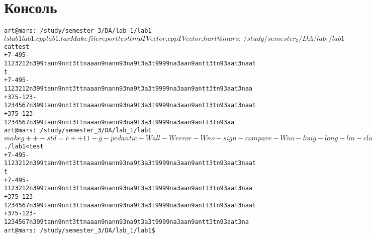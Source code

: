 \pagebreak

\section{Консоль}
\begin{alltt}art@mars:~/study/semester_3/DA/lab_1/lab1$ ls
lab1  lab1.cpp  lab1.tar  Makefile  report  test  tmp  TVector.cpp  TVector.h
art@mars:~/study/semester_3/DA/lab_1/lab1$ cat test 
+7-495-1123212	n399tann9nnt3ttnaaan9nann93na9t3a3t9999na3aan9antt3tn93aat3naatt
+7-495-1123212	n399tann9nnt3ttnaaan9nann93na9t3a3t9999na3aan9antt3tn93aat3naa
+375-123-1234567	n399tann9nnt3ttnaaan9nann93na9t3a3t9999na3aan9antt3tn93aat3naat
+375-123-1234567	n399tann9nnt3ttnaaan9nann93na9t3a3t9999na3aan9antt3tn93aa\\art@mars:~/study/semester_3/DA/lab_1/lab1$ make
g++ -std=c++11 -g -pedantic -Wall -Werror -Wno-sign-compare -Wno-long-long -lm -c lab1.cpp
g++ -std=c++11 -g -pedantic -Wall -Werror -Wno-sign-compare -Wno-long-long -lm -c TVector.cpp
g++ -std=c++11 -g -pedantic -Wall -Werror -Wno-sign-compare -Wno-long-long -lm -o lab1 lab1.o TVector.o
art@mars:~/study/semester_3/DA/lab_1/lab1$ ./lab1 < test 
+7-495-1123212	n399tann9nnt3ttnaaan9nann93na9t3a3t9999na3aan9antt3tn93aat3naatt
+7-495-1123212	n399tann9nnt3ttnaaan9nann93na9t3a3t9999na3aan9antt3tn93aat3naa
+375-123-1234567	n399tann9nnt3ttnaaan9nann93na9t3a3t9999na3aan9antt3tn93aat3naat
+375-123-1234567	n399tann9nnt3ttnaaan9nann93na9t3a3t9999na3aan9antt3tn93aat3na
art@mars:~/study/semester_3/DA/lab_1/lab1\$ 
\end{alltt}
\pagebreak

